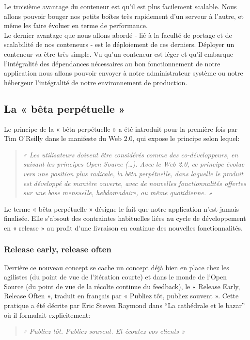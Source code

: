       Le troisième avantage du conteneur est qu’il est plus facilement scalable. Nous allons pouvoir bouger nos petits boîtes très rapidement d’un serveur à l’autre, et même les faire évoluer en terme de performance.\\

      Le dernier avantage que nous allons abordé - lié à la faculté de portage et de scalabilité de nos conteneurs - est le déploiement de ces derniers. Déployer un conteneur va être très simple. Vu qu’un conteneur est léger et qu’il embarque l’intégralité des dépendances nécessaires au bon fonctionnement de notre application nous allons pouvoir envoyer à notre administrateur système ou notre hébergeur l’intégralité de notre environnement de production.

    \subsection{La « bêta perpétuelle »}
    Le principe de la « bêta perpétuelle » a été introduit pour la première fois par Tim O’Reilly dans le manifeste du Web 2.0, qui expose le principe selon lequel:\\
    \begin{quotation}
      \emph{« Les utilisateurs doivent être considérés comme des co-développeurs, en suivant les principes Open Source (…). Avec le Web 2.0, ce principe évolue vers une position plus radicale, la bêta perpétuelle, dans laquelle le produit est développé de manière ouverte, avec de nouvelles fonctionnalités offertes sur une base mensuelle, hebdomadaire, ou même quotidienne. »}\\
    \end{quotation}

    Le terme « bêta perpétuelle » désigne le fait que notre application n’est jamais finalisée. Elle s’absout des contraintes habituelles liées au cycle de développement en « release » au profit d’une livraison en continue des nouvelles fonctionnalités.

      \subsubsection{Release early, release often}
      Derrière ce nouveau concept se cache un concept déjà bien en place chez les agilistes (du point de vue de l’itération courte) et dans le monde de l’Open Source (du point de vue de la récolte continue du feedback), le « Release Early, Release Often », traduit en français par « Publiez tôt, publiez souvent ». Cette pratique a été décrite par Eric Steven Raymond dans “La cathédrale et le bazar” où il formulait explicitement:\\
      \begin{quotation}
        \emph{« Publiez tôt. Publiez souvent. Et écoutez vos clients »}\\
      \end{quotation}

